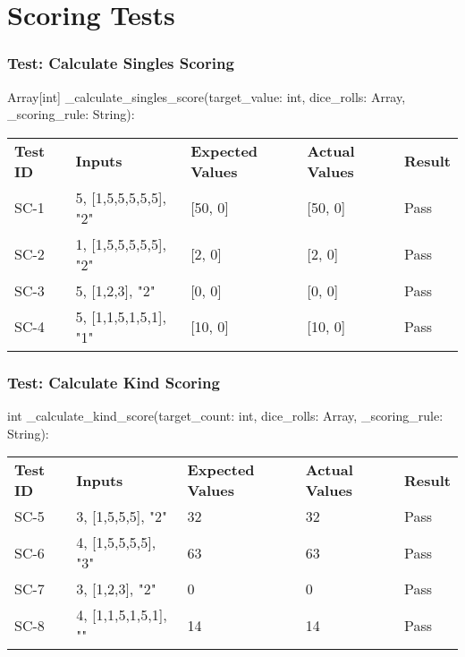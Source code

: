 \documentclass[12pt, titlepage]{article}
\begin{document}
\section{Scoring Tests}

\subsubsection{Test: Calculate Singles Scoring}
Array[int] \_calculate\_singles\_score(target\_value: int, dice\_rolls: Array, \_scoring\_rule: String):\\
\begin{tabularx}{\textwidth}{|p{2cm}|p{3.5cm}|p{4cm}|p{4cm}|p{1.5cm}|}
    \cline{1-5}
    \textbf{Test ID} & \textbf{Inputs} & \textbf{Expected Values} & \textbf{Actual Values} & \textbf{Result} \\
    \cline{1-5}
    SC-1 & 5, [1,5,5,5,5,5], "2" & [50, 0] & [50, 0] & Pass \\
    \cline{1-5}
    SC-2 & 1, [1,5,5,5,5,5], "2" & [2, 0] & [2, 0] & Pass \\
    \cline{1-5}
    SC-3 & 5, [1,2,3], "2" & [0, 0] & [0, 0] & Pass \\
    \cline{1-5}
    SC-4 & 5, [1,1,5,1,5,1], "1" & [10, 0] & [10, 0] & Pass \\
    \cline{1-5}
\end{tabularx}

\subsubsection{Test: Calculate Kind Scoring}
int \_calculate\_kind\_score(target\_count: int, dice\_rolls: Array, \_scoring\_rule: String):\\
\begin{tabularx}{\textwidth}{|p{2cm}|p{3.5cm}|p{4cm}|p{4cm}|p{1.5cm}|}
    \cline{1-5}
    \textbf{Test ID} & \textbf{Inputs} & \textbf{Expected Values} & \textbf{Actual Values} & \textbf{Result} \\
    \cline{1-5}
    SC-5 & 3, [1,5,5,5], "2" & 32 & 32 & Pass \\
    \cline{1-5}
    SC-6 & 4, [1,5,5,5,5], "3" & 63 & 63 & Pass \\
    \cline{1-5}
    SC-7 & 3, [1,2,3], "2" & 0 & 0 & Pass \\
    \cline{1-5}
    SC-8 & 4, [1,1,5,1,5,1], "" & 14 & 14 & Pass \\
    \cline{1-5}
\end{tabularx}
\end{document}
